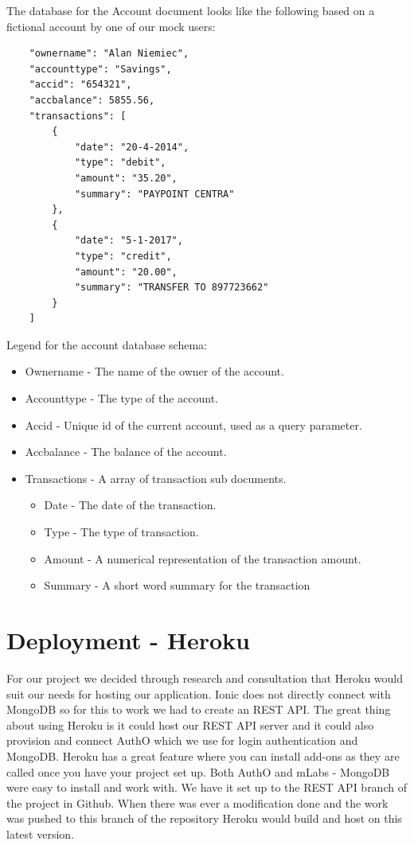 The database for the Account document looks like the following based on a fictional account by one of our mock users:
\begin{verbatim}
    "ownername": "Alan Niemiec",
    "accounttype": "Savings",
    "accid": "654321",
    "accbalance": 5855.56,
    "transactions": [
        {
            "date": "20-4-2014",
            "type": "debit",
            "amount": "35.20",
            "summary": "PAYPOINT CENTRA"
        },
        {
            "date": "5-1-2017",
            "type": "credit",
            "amount": "20.00",
            "summary": "TRANSFER TO 897723662"
        }
    ]
\end{verbatim}

Legend for the account database schema:
\begin{itemize}
    \item Ownername - The name of the owner of the account.
    \item Accounttype - The type of the account.
    \item Accid - Unique id of the current account, used as a query parameter.
    \item Accbalance - The balance of the account.
    \item Transactions - A array of transaction sub documents.
        \begin{itemize}
            \item Date - The date of the transaction.
            \item Type - The type of transaction.
            \item Amount - A numerical representation of the transaction amount.
            \item Summary - A short word summary for the transaction
        \end{itemize}
\end{itemize}



\paragraph{}
\section{Deployment - Heroku}
For our project we decided through research and consultation that Heroku would suit our needs for hosting our application. Ionic does not directly connect with MongoDB so for this to work we had to create an REST API. The great thing about using Heroku is it could host our REST API server and it could also provision and connect AuthO which we use for login authentication and MongoDB. Heroku has a great feature where you can install add-ons as they are called once you have your project set up. Both AuthO and mLabs - MongoDB were easy to install and work with. We have it set up to the REST API branch of the project in Github. When there was ever a modification done and the work was pushed to this branch of the repository Heroku would build and host on this latest version. 

